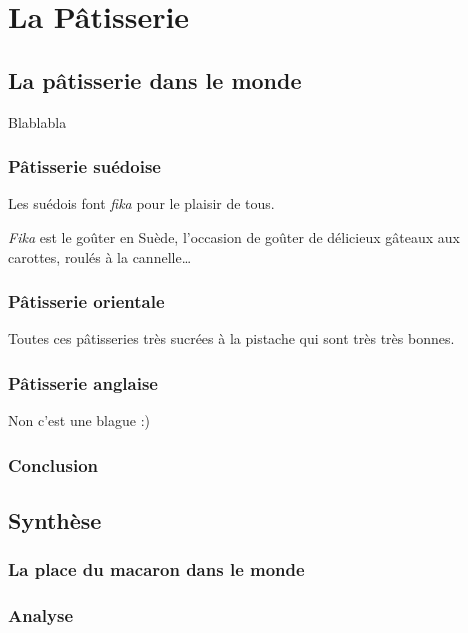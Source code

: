 
\chapter{La Pâtisserie}
\label{chap:patisserie}





\clearpage
\section{La pâtisserie dans le monde}

Blablabla

\clearpage
\subsection{Pâtisserie suédoise}
Les suédois font \emph{fika} pour le plaisir de tous.

\begin{definition}[Fika]
  \emph{Fika} est le goûter en Suède, l'occasion de goûter de délicieux gâteaux aux carottes, roulés à la cannelle\dots
\end{definition}

\subsection{Pâtisserie orientale}
Toutes ces pâtisseries très sucrées à la pistache qui sont très très bonnes.

\subsection{Pâtisserie anglaise}
Non c'est une blague :) \cite{F2011}

\subsection{Conclusion}

\clearpage
\section{Synthèse}

\subsection{La place du macaron dans le monde}

\subsection{Analyse}
